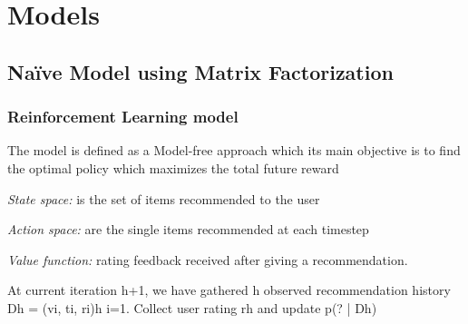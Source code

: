 \chapter{Models}
\label{chapterlabel3}

\section{Na\"{i}ve Model using Matrix Factorization}



\subsection{Reinforcement Learning model}

The model is defined as a Model-free approach which its main objective is to find the optimal policy which maximizes the total future reward

\textit{State space:} is the set of items recommended to the user

\textit{Action space:} are the single items recommended at each timestep

\textit{Value function:} rating feedback received after giving a recommendation.



At current iteration h+1, we have gathered h observed recommendation history Dh = {(vi, ti, ri)}h
i=1.
Collect user rating rh and update p(? | Dh)


